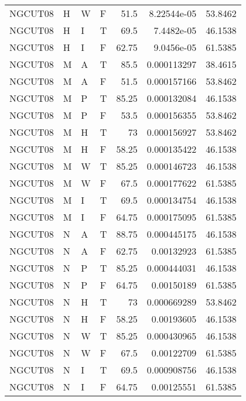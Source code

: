 \begin{table}[htb!]
{\begin{tabular}{llllrrr}
            NGCUT08  & H     & W     & F          & 51.5       & 8.22544e-05 & 53.8462  \\
            NGCUT08  & H     & I     & T          & 69.5       & 7.4482e-05  & 46.1538  \\
            NGCUT08  & H     & I     & F          & 62.75      & 9.0456e-05  & 61.5385  \\
            NGCUT08  & M     & A     & T          & 85.5       & 0.000113297 & 38.4615  \\
            NGCUT08  & M     & A     & F          & 51.5       & 0.000157166 & 53.8462  \\
            NGCUT08  & M     & P     & T          & 85.25      & 0.000132084 & 46.1538  \\
            NGCUT08  & M     & P     & F          & 53.5       & 0.000156355 & 53.8462  \\
            NGCUT08  & M     & H     & T          & 73         & 0.000156927 & 53.8462  \\
            NGCUT08  & M     & H     & F          & 58.25      & 0.000135422 & 46.1538  \\
            NGCUT08  & M     & W     & T          & 85.25      & 0.000146723 & 46.1538  \\
            NGCUT08  & M     & W     & F          & 67.5       & 0.000177622 & 61.5385  \\
            NGCUT08  & M     & I     & T          & 69.5       & 0.000134754 & 46.1538  \\
            NGCUT08  & M     & I     & F          & 64.75      & 0.000175095 & 61.5385  \\
            NGCUT08  & N     & A     & T          & 88.75      & 0.000445175 & 46.1538  \\
            NGCUT08  & N     & A     & F          & 62.75      & 0.00132923  & 61.5385  \\
            NGCUT08  & N     & P     & T          & 85.25      & 0.000444031 & 46.1538  \\
            NGCUT08  & N     & P     & F          & 64.75      & 0.00150189  & 61.5385  \\
            NGCUT08  & N     & H     & T          & 73         & 0.000669289 & 53.8462  \\
            NGCUT08  & N     & H     & F          & 58.25      & 0.00193605  & 46.1538  \\
            NGCUT08  & N     & W     & T          & 85.25      & 0.000430965 & 46.1538  \\
            NGCUT08  & N     & W     & F          & 67.5       & 0.00122709  & 61.5385  \\
            NGCUT08  & N     & I     & T          & 69.5       & 0.000908756 & 46.1538  \\
            NGCUT08  & N     & I     & F          & 64.75      & 0.00125551  & 61.5385  \\
            \hline
        \end{tabular}
    }{
    }
\end{table} 
